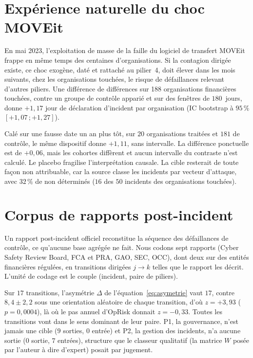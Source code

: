 \section{Expérience naturelle du choc MOVEit}

En mai 2023, l'exploitation de masse de la faille du logiciel de transfert MOVEit frappe en même
temps des centaines d'organisations. Si la contagion dirigée existe, ce choc exogène, daté et rattaché
au pilier~4, doit élever dans les mois suivants, chez les organisations touchées, le risque de
défaillances relevant d'autres piliers. Une différence de différences sur
188 organisations financières touchées, contre un groupe de contrôle apparié et sur des fenêtres de
$180$~jours, donne $+1{,}17$ jour de déclaration d'incident par organisation (IC bootstrap à $95\,\%$ $[+1{,}07\,;+1{,}27]$).

Calé sur une fausse date un an plus tôt, sur $20$ organisations traitées et $181$ de contrôle, le même
dispositif donne $+1{,}11$, sans intervalle. La différence ponctuelle est de $+0{,}06$, mais les cohortes
diffèrent et aucun intervalle du contraste n'est calculé. Le placebo fragilise l'interprétation causale. La cible
resterait de toute façon non attribuable, car la source classe les incidents par vecteur d'attaque, avec
$32\,\%$ de non déterminés ($16$ des $50$ incidents des organisations touchées).


\section{Corpus de rapports post-incident}
\label{sec:postmortems}

Un rapport post-incident officiel reconstitue la séquence des défaillances de contrôle, ce
qu'aucune base agrégée ne fait. Nous codons sept rapports (Cyber Safety Review Board, FCA et PRA,
GAO, SEC, OCC), dont deux sur des entités financières régulées, en transitions dirigées $j \to k$
telles que le rapport les décrit. L'unité de codage est le couple (incident, paire de piliers).

Sur $17$ transitions, l'asymétrie $\Delta$ de l'équation~\eqref{eq:asymetrie} vaut $17$, contre $8{,}4 \pm 2{,}2$ sous une orientation
aléatoire de chaque transition, d'où $z=+3{,}93$ ($p=0{,}0004$), là où le pas annuel d'OpRisk donnait $z=-0{,}33$.
Toutes les transitions vont dans le sens dominant de leur paire. P1, la gouvernance, n'est jamais une
cible ($9$ sorties, $0$ entrée) et P2, la gestion des incidents, n'a aucune sortie ($0$ sortie,
$7$ entrées), structure que le classeur qualitatif (la matrice $W$ posée par l'auteur à dire d'expert) posait par jugement.

